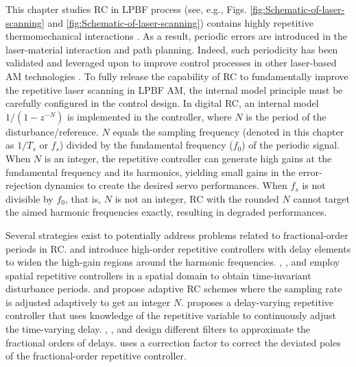 \documentclass [11pt, proquest] {uwthesis}[2020/02/24]
\begin{document}
This chapter studies RC in LPBF process (see, e.g., Figs. \ref{fig:Schematic-of-laser-scanning} and \ref{fig:Schematic-of-laser-scanning})
contains highly repetitive thermomechanical interactions \cite{carter2014influence,kruth2004selective,simchi2003effects}.
As a result, periodic errors are introduced in the laser-material
interaction and path planning. Indeed, such periodicity has been validated
and leveraged upon to improve control processes in other laser-based
AM technologies \cite{hoelzle2016spatial,lim2017multi,heralic2012height}. To fully release the capability of RC to fundamentally improve the
repetitive laser scanning in LPBF AM, the internal model principle
\cite{francis1975internal,hara1988repetitive} must be carefully
configured in the control design. In digital RC, an internal model
$1/(1-z^{-N})$ is implemented in the controller, where $N$ is the period
of the disturbance/reference. $N$ equals the sampling frequency (denoted
in this chapter as $1/T_{s}$ or $f_{s}$) divided by the fundamental
frequency ($f_{0}$) of the periodic signal. When $N$ is an integer,
the repetitive controller can generate high gains at the fundamental
frequency and its harmonics, yielding small gains in the error-rejection
dynamics to create the desired servo performances. When $f_{s}$ is
not divisible by $f_{0}$, that is, $N$ is not an integer, RC with
the rounded $N$ cannot target the aimed harmonic frequencies exactly,
resulting in degraded performances.

Several strategies exist to potentially address problems related to
fractional-order periods in RC. \cite{steinbuch2007design} and \cite{ramos2012power}
introduce high-order repetitive controllers with delay elements to
widen the high-gain regions around the harmonic frequencies. \cite{nakano1996elimination},
\cite{yao2013implementation}, and \cite{chen2013linear} employ
spatial repetitive controllers in a spatial domain to obtain time-invariant
disturbance periods. \cite{cao2002adaptive} and \cite{kurniawan2011adaptive}
propose adaptive RC schemes where the sampling rate is adjusted adaptively
to get an integer $N$. \cite{merry2011delay} proposes a delay-varying
repetitive controller that uses knowledge of the repetitive variable
to continuously adjust the time-varying delay. \cite{nazir2015analysis},
\cite{liu2017universal}, and \cite{zou2015frequency} design different
filters to approximate the fractional orders of delays. \cite{liu2016high}
uses a correction factor to correct the deviated poles of the fractional-order
repetitive controller.
\end{document}
